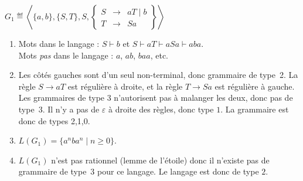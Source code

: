 \begin{exercice}
  \begin{questions}
  \item $G_1 \eqdef \left\langle \{a, b\}, \{S, T\}, S,
    \left\{\begin{array}{rcl}
    S &\rightarrow& a T \mid b\\
    T &\rightarrow& S a
    \end{array}\right\}  \right\rangle$
  \end{questions}
  \begin{corrections}
    \begin{enumerate}
    \item Mots dans le langage :
      $S \vdash b$ et
      $S \vdash aT \vdash aSa \vdash ab a$.\\
      Mots \emph{pas} dans le langage : $a$, $ab$, $baa$, etc.
    \item
      Les côtés gauches sont d'un seul non-terminal, donc grammaire de type~2.  
      La règle $S \to aT$ est régulière à droite, et la règle $T \to Sa$ est régulière à gauche.
      Les grammaires de type 3 n'autorisent pas à malanger les deux, donc pas de type~3.
      Il n'y a pas de $\varepsilon$ à droite des règles, donc type $1$. 
      La grammaire est donc de types 2,1,0.
    \item $L(G_1) = \{ a^n b a^n \mid n \ge 0 \}$.
    \item
      $L(G_1)$ n'est pas rationnel (lemme de l'étoile) donc il n'existe pas de grammaire de type~3 pour ce langage.
      Le langage est donc de type $2$. 
    \end{enumerate}
  \end{corrections}


\end{exercice}
